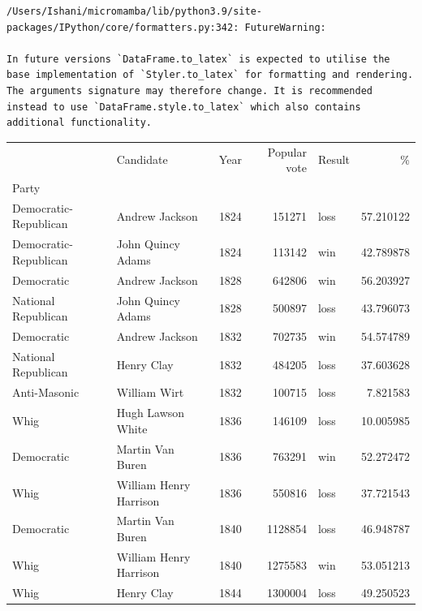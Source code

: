 \documentclass[
  letterpaper,
  DIV=11,
  numbers=noendperiod]{scrreprt}
\begin{document}
\begin{verbatim}
/Users/Ishani/micromamba/lib/python3.9/site-packages/IPython/core/formatters.py:342: FutureWarning:

In future versions `DataFrame.to_latex` is expected to utilise the base implementation of `Styler.to_latex` for formatting and rendering. The arguments signature may therefore change. It is recommended instead to use `DataFrame.style.to_latex` which also contains additional functionality.
\end{verbatim}

\begin{tabular}{llrrlr}
\toprule
{} &               Candidate &  Year &  Popular vote & Result &          \% \\
Party                 &                         &       &               &        &            \\
\midrule
Democratic-Republican &          Andrew Jackson &  1824 &        151271 &   loss &  57.210122 \\
Democratic-Republican &       John Quincy Adams &  1824 &        113142 &    win &  42.789878 \\
Democratic            &          Andrew Jackson &  1828 &        642806 &    win &  56.203927 \\
National Republican   &       John Quincy Adams &  1828 &        500897 &   loss &  43.796073 \\
Democratic            &          Andrew Jackson &  1832 &        702735 &    win &  54.574789 \\
National Republican   &              Henry Clay &  1832 &        484205 &   loss &  37.603628 \\
Anti-Masonic          &            William Wirt &  1832 &        100715 &   loss &   7.821583 \\
Whig                  &       Hugh Lawson White &  1836 &        146109 &   loss &  10.005985 \\
Democratic            &        Martin Van Buren &  1836 &        763291 &    win &  52.272472 \\
Whig                  &  William Henry Harrison &  1836 &        550816 &   loss &  37.721543 \\
Democratic            &        Martin Van Buren &  1840 &       1128854 &   loss &  46.948787 \\
Whig                  &  William Henry Harrison &  1840 &       1275583 &    win &  53.051213 \\
Whig                  &              Henry Clay &  1844 &       1300004 &   loss &  49.250523 \\

\end{tabular}
\end{document}
